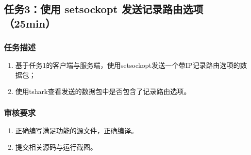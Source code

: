 \documentclass{article}
\begin{document}
\newpage
\subsection{任务3：使用 setsockopt 发送记录路由选项（25min）}

\subsubsection{任务描述}
\begin{enumerate}
	\item 基于任务1的客户端与服务端，使用setsockopt发送一个带IP记录路由选项的数据包；
	\item 使用tshark查看发送的数据包中是否包含了记录路由选项。

\end{enumerate}

\subsubsection{审核要求}
\begin{enumerate}
	\item 正确编写满足功能的源文件，正确编译。
	\item 提交相关源码与运行截图。
\end{enumerate}
\end{document}
